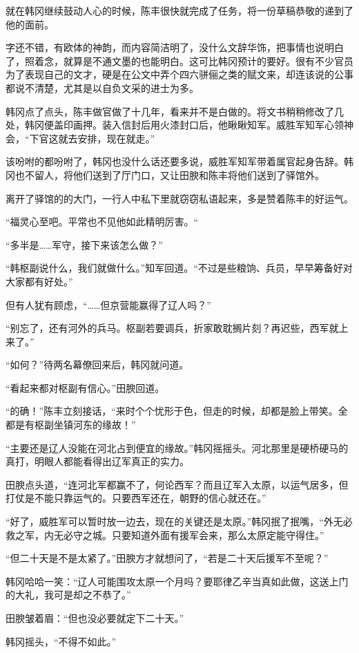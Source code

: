 就在韩冈继续鼓动人心的时候，陈丰很快就完成了任务，将一份草稿恭敬的递到了他的面前。

字还不错，有欧体的神韵，而内容简洁明了，没什么文辞华饰，把事情也说明白了，照着念，就算是不通文墨的也能明白。这可比韩冈预计的要好。很有不少官员为了表现自己的文才，硬是在公文中弄个四六骈俪之类的赋文来，却连该说的公事都说不清楚，尤其是以自负文采的进士为多。

韩冈点了点头，陈丰做官做了十几年，看来并不是白做的。将文书稍稍修改了几处，韩冈便盖印画押。装入信封后用火漆封口后，他瞅瞅知军。威胜军知军心领神会，“下官这就去安排，现在就走。”

该吩咐的都吩咐了，韩冈也没什么话还要多说，威胜军知军带着属官起身告辞。韩冈也不留人，将他们送到了厅门口，又让田腴和陈丰将他们送到了驿馆外。

离开了驿馆的的大门，一行人中私下里就窃窃私语起来，多是赞着陈丰的好运气。

“福灵心至吧。平常也不见他如此精明厉害。“

“多半是……军守，接下来该怎么做？”

“韩枢副说什么，我们就做什么。”知军回道。“不过是些粮饷、兵员，早早筹备好对大家都有好处。”

但有人犹有顾虑，“……但京营能赢得了辽人吗？”

“别忘了，还有河外的兵马。枢副若要调兵，折家敢耽搁片刻？再迟些，西军就上来了。”

“如何？”待两名幕僚回来后，韩冈就问道。

“看起来都对枢副有信心。”田腴回道。

“的确！”陈丰立刻接话，“来时个个忧形于色，但走的时候，却都是脸上带笑。全都是有枢副坐镇河东的缘故！”

“主要还是辽人没能在河北占到便宜的缘故。”韩冈摇摇头。河北那里是硬桥硬马的真打，明眼人都能看得出辽军真正的实力。

田腴点头道，“连河北军都赢不了，何论西军？而且辽军入太原，以运气居多，但打仗是不能只靠运气的。只要西军还在，朝野的信心就还在。”

“好了，威胜军可以暂时放一边去，现在的关键还是太原。”韩冈抿了抿嘴，“外无必救之军，内无必守之城。只要知道外面有援军会来，那么太原定能守得住。”

“但二十天是不是太紧了。”田腴方才就想问了，“若是二十天后援军不至呢？”

韩冈哈哈一笑：“辽人可能围攻太原一个月吗？要耶律乙辛当真如此做，这送上门的大礼，我可是却之不恭了。”

田腴皱着眉：“但也没必要就定下二十天。”

韩冈摇头，“不得不如此。”

